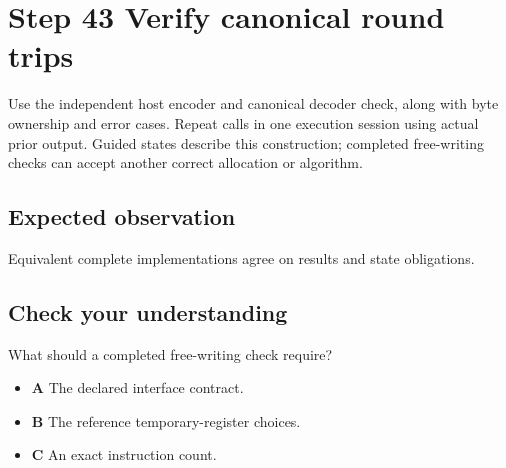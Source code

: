 \section{Step 43 Verify canonical round trips}\label{base64-s43}

Use the independent host encoder and canonical decoder check, along with byte ownership and error cases. Repeat calls in one execution session using actual prior output. Guided states describe this construction; completed free-writing checks can accept another correct allocation or algorithm.

\subsection{Expected observation}
Equivalent complete implementations agree on results and state obligations.

\subsection{Check your understanding}
What should a completed free-writing check require?

\begin{itemize}
  \item \textbf{A} The declared interface contract.
  \item \textbf{B} The reference temporary-register choices.
  \item \textbf{C} An exact instruction count.
\end{itemize}
